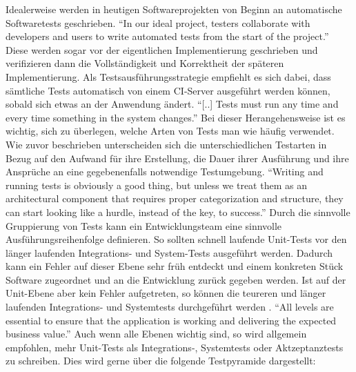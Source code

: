 Idealerweise werden in heutigen Softwareprojekten von Beginn an automatische Softwaretests geschrieben. "`In our ideal project, testers collaborate with developers and users to write automated tests from the start of the project."' \citep[S.][S. 83]{HumFar10} Diese werden sogar vor der eigentlichen Implementierung geschrieben und verifizieren dann die Vollständigkeit und Korrektheit der späteren Implementierung. Als Testsausführungsstrategie empfiehlt es sich dabei, dass sämtliche Tests automatisch von einem \ac{CI}-Server ausgeführt werden können, sobald sich etwas an der Anwendung ändert. \citep[Vgl.][S. 83]{HumFar10} "`[..] Tests must run any time and every time something in the system changes."' \citep[S.][S. 131]{DuvMatAnd07} Bei dieser Herangehensweise ist es wichtig, sich zu überlegen, welche Arten von Tests man wie häufig verwendet. Wie zuvor beschrieben unterscheiden sich die unterschiedlichen Testarten in Bezug auf den Aufwand für ihre Erstellung, die Dauer ihrer Ausführung und ihre Ansprüche an eine gegebenenfalls notwendige Testumgebung. "`Writing and running tests is obviously a good thing, but unless we treat them as an architectural component that requires proper categorization and structure, they can start looking like a hurdle, instead of the key, to success."' \citep[S.][S. 138]{DuvMatAnd07} Durch die sinnvolle Gruppierung von Tests kann ein Entwicklungsteam eine sinnvolle Ausführungsreihenfolge definieren. So sollten schnell laufende Unit-Tests vor den länger laufenden Integrations- und System-Tests ausgeführt werden. Dadurch kann ein Fehler auf dieser Ebene sehr früh entdeckt und einem konkreten Stück Software zugeordnet und an die Entwicklung zurück gegeben werden. Ist auf der Unit-Ebene aber kein Fehler aufgetreten, so können die teureren und länger laufenden Integrations- und Systemtests durchgeführt werden \citep[Vgl.][S. 138]{DuvMatAnd07}. "`All levels are essential to ensure that the application is working and delivering the expected business value."' \citep[S.][S. 178]{HumFar10} Auch wenn alle Ebenen wichtig sind, so wird allgemein empfohlen, mehr Unit-Tests als Integrations-, Systemtests oder Aktzeptanztests zu schreiben. Dies wird gerne über die folgende Testpyramide dargestellt:

